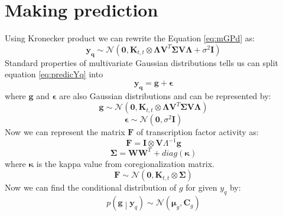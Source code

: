 \section{Making prediction}
Using Kronecker product we can rewrite the Equation \ref{eq:mGPd} as:
\begin{equation} \label{eq:predicYq}
  \mathbf{y_q}  \sim \mathcal{N} \left( \mathbf{0}, 
    \mathbf{K}_{t,t} \otimes \boldsymbol{\Lambda} \mathbf{V}^T\boldsymbol{\Sigma} \mathbf{V} \boldsymbol{\Lambda} +
    \sigma^2\mathbf{I}\right)
\end{equation}
Standard properties of multivariate Gaussian distributions tells us can split equation \ref{eq:predicYq} into
\begin{equation} \label{eq:gEp}
  \mathbf{y_q} = \mathbf{g} + \boldsymbol{\epsilon}
\end{equation}
where $\mathbf{g}$ and $\boldsymbol{\epsilon}$ are also Gaussian distributions and can be represented by:
\begin{equation}\label{eq:g}
  \mathbf{g} \sim \mathcal{N} \left( \mathbf{0}, 
    \mathbf{K}_{t,t} \otimes 
    \boldsymbol{\Lambda} \mathbf{V}^T\boldsymbol{\Sigma} \mathbf{V} \boldsymbol{\Lambda} \right)
\end{equation}
\begin{equation}\label{eq:Epsi}
  \boldsymbol{\epsilon} \sim \mathcal{N} \left(\mathbf{0},\sigma^2\mathbf{I}\right)
\end{equation}
Now we can represent the matrix $\mathbf{F}$ of transcription factor activity as:
\begin{equation}\label{eq:F}
  \mathbf{F} = \mathbf{I} \otimes \mathbf{V} \Lambda^{-1} \mathbf{g}
\end{equation}
\begin{equation}\label{eq:Sigma}
  \boldsymbol{\Sigma} = \mathbf{W}\mathbf{W}^T + diag\left(\boldsymbol{\kappa}\right)
\end{equation}
where $\boldsymbol{\kappa}$ is the kappa value from coregionalization matrix.
\begin{equation} \label{eq:predictionF}
  \mathbf{F}  \sim \mathcal{N} \left( \mathbf{0},\mathbf{K}_{t,t} \otimes \boldsymbol{\Sigma}\right)
\end{equation}
Now we can find the conditional distribution of $g$ for given $y_q$ by:
\begin{equation}\label{eq:gGivenYq}
 p\left(\mathbf{g} \middle| \mathbf{y}_q\right) \sim 
    \mathcal{N} \left( \boldsymbol{\mu}_g, \mathbf{C}_g\right)
\end{equation}
